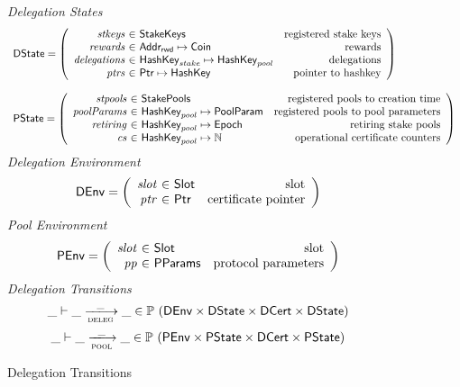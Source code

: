 \begin{figure}
  \emph{Delegation States}
  \begin{equation*}
    \begin{array}{l}
    \DState =
    \left(\begin{array}{r@{~\in~}lr}
      \var{stkeys} & \StakeKeys & \text{registered stake keys}\\
      \var{rewards} & \AddrRWD \mapsto \Coin & \text{rewards}\\
      \var{delegations} & \HashKey_{stake} \mapsto \HashKey_{pool} & \text{delegations}\\
      \var{ptrs} & \Ptr \mapsto \HashKey & \text{pointer to hashkey}\\
    \end{array}\right)
    \\
    \\
    \PState =
    \left(\begin{array}{r@{~\in~}lr}
      \var{stpools} & \StakePools & \text{registered pools to creation time}\\
      \var{poolParams} & \HashKey_{pool} \mapsto \PoolParam
        & \text{registered pools to pool parameters}\\
      \var{retiring} & \HashKey_{pool} \mapsto \Epoch & \text{retiring stake pools}\\
      \var{cs} & \HashKey_{pool} \mapsto \N & \text{operational certificate counters}\\
    \end{array}\right)
    \end{array}
  \end{equation*}
  \emph{Delegation Environment}
  \begin{equation*}
    \DEnv =
    \left(
      \begin{array}{r@{~\in~}lr}
        \var{slot} & \Slot & \text{slot}\\
        \var{ptr} & \Ptr & \text{certificate pointer}\\
      \end{array}
    \right)
  \end{equation*}
  \emph{Pool Environment}
  \begin{equation*}
    \PEnv =
    \left(
      \begin{array}{r@{~\in~}lr}
        \var{slot} & \Slot & \text{slot}\\
        \var{pp} & \PParams & \text{protocol parameters}\\
      \end{array}
    \right)
  \end{equation*}
  \emph{Delegation Transitions}
  \begin{equation*}
    \_ \vdash \_ \trans{deleg}{\_} \_ \in
      \powerset (\DEnv \times \DState \times \DCert \times \DState)
  \end{equation*}
  \begin{equation*}
    \_ \vdash \_ \trans{pool}{\_} \_ \in
    \powerset (\PEnv \times \PState \times \DCert \times \PState)
  \end{equation*}
  \caption{Delegation Transitions}
  \label{fig:delegation-transitions}
\end{figure}


